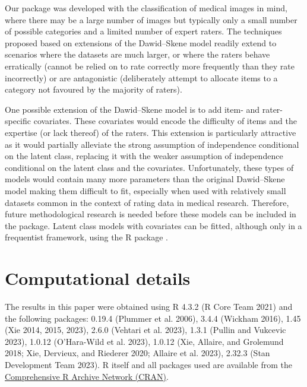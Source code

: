 Our package was developed with the classification of medical images in mind,
where there may be a large number of images but
typically only a small number of possible categories and a limited number of
expert raters. The techniques proposed based on extensions of the Dawid--Skene model
readily extend to scenarios where the datasets are much larger, or where the
raters behave erratically (cannot be relied on to rate correctly more
frequently than they rate incorrectly) or are antagonistic (deliberately
attempt to allocate items to a category not favoured by the majority of
raters).

One possible extension of the Dawid--Skene model is to add item- and
rater-specific covariates. These covariates would encode the difficulty of
items and the expertise (or lack thereof) of the raters. This extension is
particularly attractive as it would partially alleviate the strong assumption
of independence conditional on the latent class, replacing it with the weaker
assumption of independence conditional on the latent class and the covariates.
Unfortunately, these types of models would contain many more parameters than
the original Dawid--Skene model making them difficult to fit, especially when
used with relatively small datasets common in the context of rating data in
medical research. Therefore, future methodological research is needed before
these models can be included in the  package. Latent class
models with covariates can be fitted, although only in a frequentist framework,
using the R package .

\hypertarget{computational-details}{%
\section{Computational details}\label{computational-details}}

The results in this paper were obtained using
R 4.3.2 (R Core Team 2021)
and the following packages:
 0.19.4 (Plummer et al. 2006),
 3.4.4 (Wickham 2016),
 1.45 (Xie 2014, 2015, 2023),
 2.6.0 (Vehtari et al. 2023),
 1.3.1 (Pullin and Vukcevic 2023),
 1.0.12 (O'Hara-Wild et al. 2023),
 1.0.12 (Xie, Allaire, and Grolemund 2018; Xie, Dervieux, and Riederer 2020; Allaire et al. 2023),
 2.32.3 (Stan Development Team 2023).
R itself and all packages used are available from the \href{https://CRAN.R-project.org/}{Comprehensive R Archive
Network (CRAN)}.


